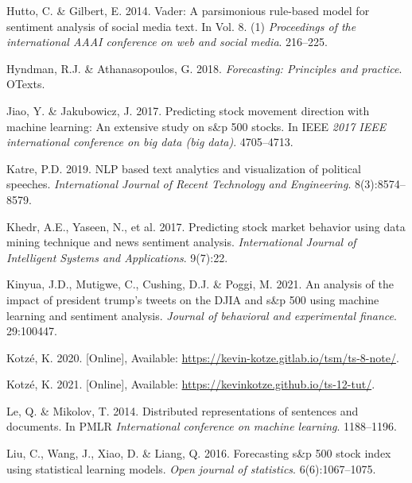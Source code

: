 \documentclass[11pt,preprint, authoryear]{elsarticle}
\numberwithin{equation}{section}
\numberwithin{figure}{section}
\numberwithin{table}{section}
\newlength{\cslhangindent}
\newenvironment{CSLReferences}%
  {\setlength{\parindent}{0pt}%
  \everypar{\setlength{\hangindent}{\cslhangindent}}\ignorespaces}%
  {\par}
\begin{document}
\begin{CSLReferences}{1}{0}
\leavevmode{}%
Hutto, C. \& Gilbert, E. 2014. Vader: A parsimonious rule-based model
for sentiment analysis of social media text. In Vol. 8. (1)
\emph{Proceedings of the international AAAI conference on web and social
media}. 216--225.

\leavevmode{}%
Hyndman, R.J. \& Athanasopoulos, G. 2018. \emph{Forecasting: Principles
and practice}. OTexts.

\leavevmode{}%
Jiao, Y. \& Jakubowicz, J. 2017. Predicting stock movement direction
with machine learning: An extensive study on s\&p 500 stocks. In IEEE
\emph{2017 IEEE international conference on big data (big data)}.
4705--4713.

\leavevmode{}%
Katre, P.D. 2019. NLP based text analytics and visualization of
political speeches. \emph{International Journal of Recent Technology and
Engineering}. 8(3):8574--8579.

\leavevmode{}%
Khedr, A.E., Yaseen, N., et al. 2017. Predicting stock market behavior
using data mining technique and news sentiment analysis.
\emph{International Journal of Intelligent Systems and Applications}.
9(7):22.

\leavevmode{}%
Kinyua, J.D., Mutigwe, C., Cushing, D.J. \& Poggi, M. 2021. An analysis
of the impact of president trump's tweets on the DJIA and s\&p 500 using
machine learning and sentiment analysis. \emph{Journal of behavioral and
experimental finance}. 29:100447.

\leavevmode{}%
Kotzé, K. 2020. {[}Online{]}, Available:
\url{https://kevin-kotze.gitlab.io/tsm/ts-8-note/}.

\leavevmode{}%
Kotzé, K. 2021. {[}Online{]}, Available:
\url{https://kevinkotze.github.io/ts-12-tut/}.

\leavevmode{}%
Le, Q. \& Mikolov, T. 2014. Distributed representations of sentences and
documents. In PMLR \emph{International conference on machine learning}.
1188--1196.

\leavevmode{}%
Liu, C., Wang, J., Xiao, D. \& Liang, Q. 2016. Forecasting s\&p 500
stock index using statistical learning models. \emph{Open journal of
statistics}. 6(6):1067--1075.


\end{CSLReferences}
\end{document}
